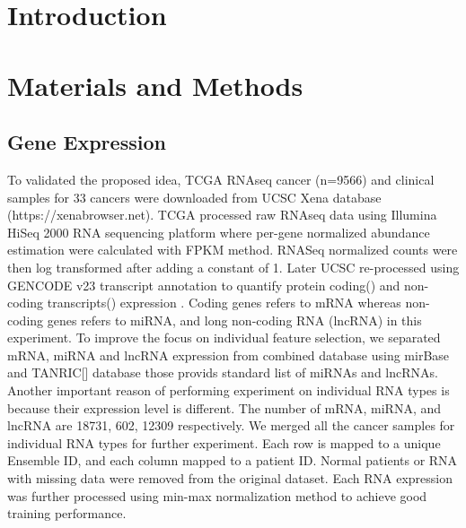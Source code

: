 \documentclass{bioinfo}
\begin{document}
\section{Introduction}
\section{Materials and Methods}
\subsection{Gene Expression}
To validated the proposed idea, TCGA RNAseq cancer (n=9566) and clinical samples for 33 cancers were downloaded from UCSC Xena database (https://xenabrowser.net). TCGA processed raw RNAseq data using Illumina HiSeq 2000 RNA sequencing platform where per-gene normalized abundance estimation were calculated with FPKM method. RNASeq normalized counts were then log transformed after adding a constant of 1.  Later UCSC re-processed using GENCODE v23 transcript annotation to quantify protein coding() and non-coding transcripts() expression \cite{harrow2006gencode}. Coding genes refers to mRNA whereas non-coding genes refers to miRNA, and long non-coding RNA (lncRNA) in this experiment. To improve the focus on individual feature selection, we separated mRNA, miRNA and lncRNA expression from combined database using mirBase and TANRIC[] database those provids standard list of miRNAs and lncRNAs. Another important reason of performing experiment on individual RNA types is because their expression level is different. The number of mRNA, miRNA, and lncRNA are 18731, 602, 12309 respectively. We merged all the cancer samples for individual RNA types for further experiment. Each row is mapped to a unique Ensemble ID, and each column mapped to a patient ID. Normal patients or RNA with missing data were removed from the original dataset. Each RNA expression was further processed using min-max normalization method to achieve good training performance. 
\end{document}
